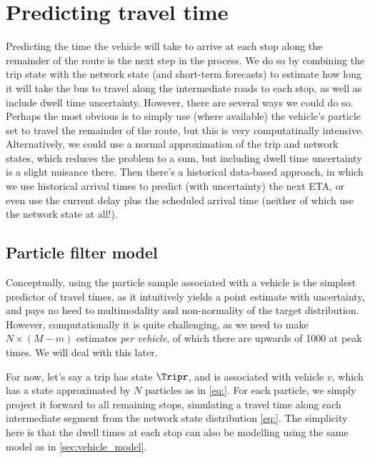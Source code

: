 \section{Predicting travel time}
\label{sec:trip_travel_time}

Predicting the time the vehicle will take to arrive at each stop along the remainder of the route is the next step in the process. We do so by combining the trip state with the network state (and short-term forecasts) to estimate how long it will take the bus to travel along the intermediate roads to each stop, as well as include dwell time uncertainty. However, there are several ways we could do so. Perhaps the most obvious is to simply use (where available) the vehicle's particle set to travel the remainder of the route, but this is very computatinally intensive. Alternatively, we could use a normal approximation of the trip and network states, which reduces the problem to a sum, but including dwell time uncertainty is a slight nuisance there. Then there's a historical data-based approach, in which we use historical arrival times to predict (with uncertainty) the next ETA, or even use the current delay plus the scheduled arrival time (neither of which use the network state at all!).

% 

\subsection{Particle filter model}
\label{sec:trip_travel_time_pf}

Conceptually, using the particle sample associated with a vehicle is the simplest predictor of travel times, as it intuitively yields a point estimate with uncertainty, and pays no heed to multimodality and non-normality of the target distribution. However, computationally it is quite challenging, as we need to make $N\times(M-m)$ estimates \emph{per vehicle}, of which there are upwards of 1000 at peak times. We will deal with this later.


For now, let's say a trip has state $\Tripr$, and is associated with vehicle $v$, which has a state approximated by $N$ particles as in \cref{eq:}. For each particle, we simply project it forward to all remaining stops, simulating a travel time along each intermediate segment from the network state distribution \cref{eq:}. The simplicity here is that the dwell times at each stop can also be modelling using the same model as in \cref{sec:vehicle_model}.


